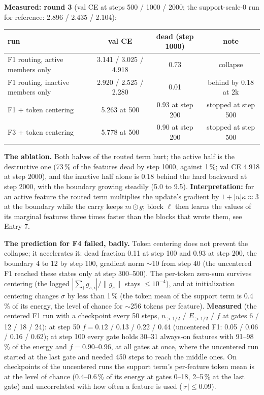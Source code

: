 \documentclass[11pt,a4paper]{article}
\begin{document}
\textbf{Measured: round 3} (val CE at steps 500 / 1000 / 2000; the support-scale-0 run for reference: 2.896 / 2.435 /
2.104):

\begin{center}\small
\begin{tabular}{lccc}
\toprule
run & val CE & dead (step 1000) & note \\
\midrule
F1 routing, active members only   & 3.141 / 3.025 / 4.918 & 0.73 & collapse \\
F1 routing, inactive members only & 2.920 / 2.525 / 2.280 & 0.01 & behind by 0.18 at 2k \\
F1 + token centering              & 5.263 at 500          & 0.93 at step 200 & stopped at step 500 \\
F3 + token centering              & 5.778 at 500          & 0.90 at step 200 & stopped at step 500 \\
\bottomrule
\end{tabular}
\end{center}

\textbf{The ablation.}  Both halves of the routed term hurt; the active half is the destructive one (73\,\% of the
features dead by step 1000, against 1\,\%; val CE 4.918 at step 2000), and the inactive half alone is 0.18 behind
the hard backward at step 2000, with the boundary growing steadily (5.0 to 9.5).  \textbf{Interpretation:} for an
active feature the routed term multiplies the update's gradient by \(1+|u|\kappa\approx3\) at the boundary while the
carry keeps \(m\odot g\); block \(\ell\) then learns the values of its marginal features three times faster than the
blocks that wrote them, see Entry 7.

\textbf{The prediction for F4 failed, badly.}  Token centering does not prevent the collapse; it accelerates it: dead
fraction 0.11 at step 100 and 0.93 at step 200, the boundary 4 to 12 by step 100, gradient norm \(\sim\)10 from step 40
(the uncentered F1 reached these states only at step 300--500).  The per-token zero-sum survives centering (the
logged \(|\sum_i g_{s,i}|/\lVert g_s\rVert\) stays \(\le10^{-4}\)), and at initialization centering changes \(\sigma\) by
less than 1\,\% (the token mean of the support term is 0.4\,\% of its energy, the level of chance for \(\sim\)256
tokens per feature).  \textbf{Measured} (the centered F1 run with a checkpoint every 50 steps, \(n_{>1/2}\) / \(E_{>1/2}\) / \(f\) at gates
6 / 12 / 18 / 24): at step 50 \(f=0.12\) / 0.13 / 0.22 / 0.44 (uncentered F1: 0.05 / 0.06 / 0.16 / 0.62); at step 100
every gate holds 30--31 always-on features with 91--98\,\% of the energy and \(f=0.90\)--0.96, at all gates at once,
where the uncentered run started at the last gate and needed 450 steps to reach the middle ones.  On checkpoints of
the uncentered runs the support term's per-feature token mean is at the level of chance (0.4--0.6\,\% of its energy
at gates 0--18, 2--5\,\% at the last gate) and uncorrelated with how often a feature is used (\(|r|\le0.09\)).
\end{document}
